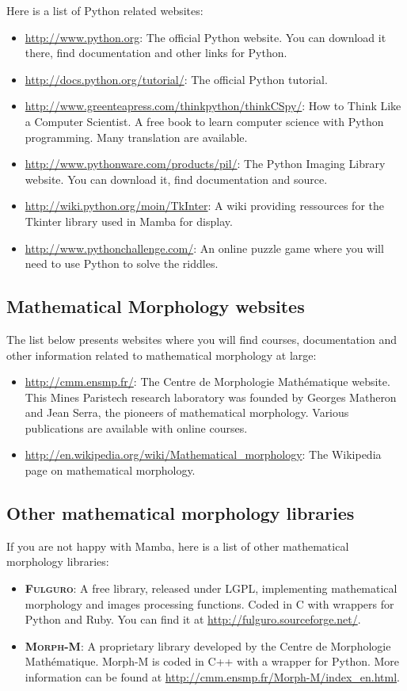 \documentclass[a4paper,10pt,oneside]{article}
\begin{document}
Here is a list of Python related websites:

\begin{itemize}
\item \url{http://www.python.org}: The official Python website. You can download
it there, find documentation and other links for Python.
\item \url{http://docs.python.org/tutorial/}: The official Python tutorial.
\item \url{http://www.greenteapress.com/thinkpython/thinkCSpy/}: How to Think 
Like a Computer Scientist. A free book to learn computer science with Python
programming. Many translation are available.
\item \url{http://www.pythonware.com/products/pil/}: The Python Imaging Library
website. You can download it, find documentation and source.
\item \url{http://wiki.python.org/moin/TkInter}: A wiki providing ressources
for the Tkinter library used in Mamba for display.
\item \url{http://www.pythonchallenge.com/}: An online puzzle game where you
will need to use Python to solve the riddles.
\end{itemize}

\subsection{Mathematical Morphology websites}

The list below presents websites where you will find courses, documentation and
other information related to mathematical morphology at large:

\begin{itemize}
\item \url{http://cmm.ensmp.fr/}: The Centre de Morphologie Math\'{e}matique
website. This Mines Paristech research laboratory was founded by Georges Matheron 
and Jean Serra, the pioneers of mathematical
morphology. Various publications are available with online courses.
\item \url{http://en.wikipedia.org/wiki/Mathematical_morphology}: The Wikipedia
page on mathematical morphology.
\end{itemize}

\subsection{Other mathematical morphology libraries}

If you are not happy with Mamba, here is a list of other mathematical morphology
libraries:

\begin{itemize}
\item \textsc{\textbf{Fulguro}}: A free library, released under LGPL, implementing
mathematical morphology and images processing functions. Coded in C with wrappers
for Python and Ruby. You can find it at \url{http://fulguro.sourceforge.net/}.
\item \textsc{\textbf{Morph-M}}: A proprietary library developed by the Centre
de Morphologie Math\'{e}matique. Morph-M is coded in C++ with a wrapper for
Python. More information can be found at \url{http://cmm.ensmp.fr/Morph-M/index_en.html}.
\end{itemize}
\end{document}
